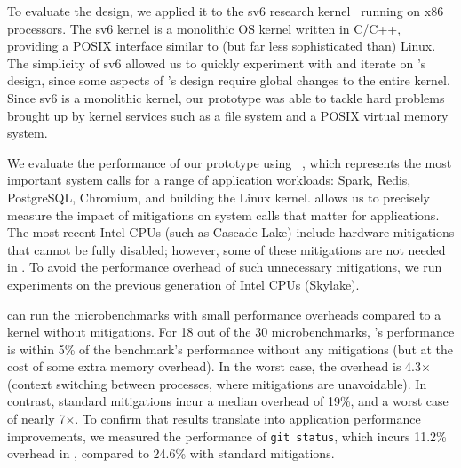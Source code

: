 To evaluate the \sys design, we applied it to the sv6 research
kernel~\cite{clements:sc} running on x86 processors.  The sv6 kernel
is a monolithic OS kernel written in C/C++, providing a POSIX
interface similar to (but far less sophisticated than) Linux.  The
simplicity of sv6 allowed us to quickly experiment with and iterate on
\sys's design, since some aspects of \sys's design require global
changes to the entire kernel.  Since sv6 is a monolithic kernel,
our prototype was able to tackle hard problems brought up by kernel
services such as a file system and a POSIX virtual memory system.

We evaluate the performance of our \sys prototype using
\bench~\cite{lebench}, which represents the most important system calls
for a range of application workloads: Spark, Redis, PostgreSQL,
Chromium, and building the Linux kernel.  \bench allows us to precisely
measure the impact of mitigations on system calls that matter
for applications.  The most recent Intel CPUs (such as Cascade Lake)
include hardware mitigations that cannot be fully disabled; however, some of
these mitigations are not needed in \sys.  To avoid the performance
overhead of such unnecessary mitigations, we run experiments on
the previous generation of Intel CPUs (Skylake).

\sys can run the \bench microbenchmarks with small performance
overheads compared to a kernel without mitigations.  For 18 out of
the 30 \bench microbenchmarks, \sys's performance is within 5\% of the
benchmark's performance without any mitigations (but at the cost of some
extra memory overhead).  In the worst case, the overhead is 4.3$\times$
(context switching between processes, where mitigations are unavoidable).
In contrast, standard mitigations incur a median overhead of 19\%, and
a worst case of nearly 7$\times$.  To confirm that \bench results translate
into application performance improvements, we measured the performance
of \texttt{git status}, which incurs 11.2\% overhead in \sys, compared
to 24.6\% with standard mitigations.



